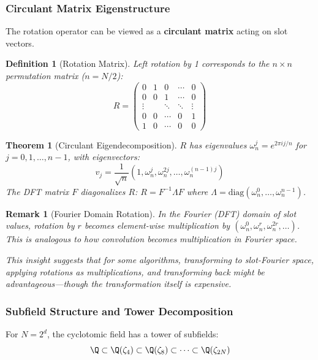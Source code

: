 \documentclass[11pt,a4paper]{article}
\newtheorem{definition}{Definition}
\newtheorem{theorem}{Theorem}
\newtheorem{remark}{Remark}
\begin{document}
\subsubsection{Circulant Matrix Eigenstructure}

The rotation operator can be viewed as a \textbf{circulant matrix} acting on slot vectors.

\begin{definition}[Rotation Matrix]
Left rotation by 1 corresponds to the $n \times n$ permutation matrix ($n = N/2$):
\[
R = \begin{pmatrix}
0 & 1 & 0 & \cdots & 0 \\
0 & 0 & 1 & \cdots & 0 \\
\vdots & & \ddots & \ddots & \vdots \\
0 & 0 & \cdots & 0 & 1 \\
1 & 0 & \cdots & 0 & 0
\end{pmatrix}
\]
\end{definition}

\begin{theorem}[Circulant Eigendecomposition]
$R$ has eigenvalues $\omega_n^j = e^{2\pi i j/n}$ for $j = 0, 1, \ldots, n-1$, with eigenvectors:
\[
v_j = \frac{1}{\sqrt{n}}(1, \omega_n^j, \omega_n^{2j}, \ldots, \omega_n^{(n-1)j})
\]
The DFT matrix $F$ diagonalizes $R$: $R = F^{-1} \Lambda F$ where $\Lambda = \text{diag}(\omega_n^0, \ldots, \omega_n^{n-1})$.
\end{theorem}

\begin{remark}[Fourier Domain Rotation]
In the Fourier (DFT) domain of slot values, rotation by $r$ becomes element-wise multiplication by $(\omega_n^0, \omega_n^r, \omega_n^{2r}, \ldots)$. This is analogous to how convolution becomes multiplication in Fourier space.

This insight suggests that for some algorithms, transforming to slot-Fourier space, applying rotations as multiplications, and transforming back might be advantageous—though the transformation itself is expensive.
\end{remark}

\subsubsection{Subfield Structure and Tower Decomposition}

For $N = 2^d$, the cyclotomic field has a tower of subfields:
\[
\Q \subset \Q(\zeta_4) \subset \Q(\zeta_8) \subset \cdots \subset \Q(\zeta_{2N})
\]
\end{document}
